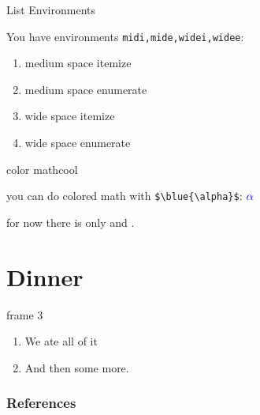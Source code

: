 \documentclass{beamer}%
\begin{document}
\begin{frame}[fragile]{List Environments}
\begin{midi}
\item You have environments \verb!midi,mide,widei,widee!:
\begin{enumerate}
\item medium space itemize
\item medium space enumerate
\item wide space itemize
\item wide space enumerate
\end{enumerate}
\end{midi}

\end{frame}

\begin{frame}[fragile]{color math}{cool}
\begin{midi}
\item you can do colored math with \verb!$\blue{\alpha}$!: ${\color{blue}{\alpha}}$
\item for now there is only  and .
\end{midi}


\end{frame}


\section{Dinner}

\begin{frame}{frame 3}
\begin{enumerate}
	\item We ate all of it
	\item And then some more.
\end{enumerate}
\end{frame}

\begin{frame}
        \frametitle{References}
		
		
\end{frame}
\end{document}
